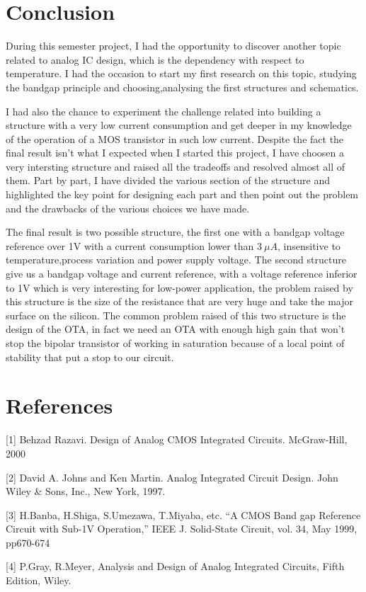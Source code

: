 \documentclass[11pt,a4paper]{report}
\begin{document}
\chapter*{Conclusion}

During this semester project, I had the opportunity to discover another topic related to analog IC design, which is the dependency with respect to temperature. I had the occasion to start my first research on this topic, studying the bandgap principle and choosing,analysing the first structures and schematics. 

I had also the chance to experiment the challenge related into building a structure with a very low current consumption and get deeper in my knowledge of the operation of a MOS transistor in such low current. Despite the fact the final result isn't what I expected when I started this project, I have choosen a very intersting structure and raised all the tradeoffs and resolved almost all of them. Part by part, I have divided the various section of the structure and highlighted the key point for designing each part and then point out the problem and the drawbacks of the various choices we have made.

The final result is two possible structure, the first one with a bandgap voltage reference over 1V with a current consumption lower than $3~\mu A$, insensitive to temperature,process variation and power supply voltage. The second structure give us a bandgap voltage and current reference, with a voltage reference inferior to 1V which is very interesting for low-power application, the problem raised by this structure is the size of the resistance that are very huge and take the major surface on the silicon.
The common problem raised of this two structure is the design of the OTA, in fact we need an OTA with enough high gain that won't stop the bipolar transistor of working in saturation because of a local point of stability that put a stop to our circuit.



\begin{appendices}

\end{appendices}


\chapter*{References}

[1] Behzad Razavi. Design of Analog CMOS Integrated Circuits. McGraw-Hill, 2000 

[2] David A. Johns and Ken Martin. Analog Integrated Circuit Design. John Wiley \& Sons, Inc., New York, 1997.

[3] H.Banba, H.Shiga, S.Umezawa, T.Miyaba, etc. “A CMOS Band gap Reference Circuit with Sub-1V Operation,” IEEE J.
Solid-State Circuit, vol. 34, May 1999, pp670-674 

[4] P.Gray, R.Meyer, Analysis and Design of Analog Integrated Circuits, Fifth Edition, Wiley.
\end{document}

